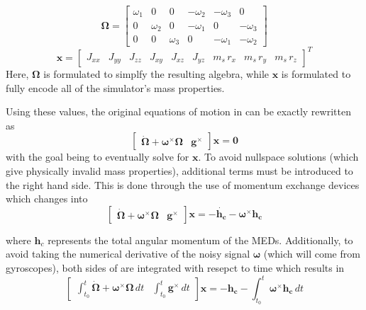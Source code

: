 \begin{equation}
    \bm{\Omega} =
        \begin{bmatrix}
            \omega_1 & 0 & 0 & -\omega_2 & -\omega_3 & 0 \\
            0 & \omega_2 & 0 & -\omega_1 & 0 & -\omega_3 \\
            0 & 0 & \omega_3 & 0 & -\omega_1 & -\omega_2
        \end{bmatrix}
\end{equation}
\begin{equation}
    \bm{x} = \begin{bmatrix}
        J_{xx} & J_{yy} & J_{zz} & J_{xy} & J_{xz} & J_{yz} & m_s\,r_x & m_s\,r_y & m_s\,r_z
    \end{bmatrix}^T
\end{equation}
Here, $\bm{\Omega}$ is formulated to simplfy the resulting algebra, while $\bm{x}$ is formulated to fully encode all of the simulator's mass properties.

Using these values, the original equations of motion in  can be exactly rewritten as 
\begin{equation}\label{equation:no_MEDs}
    \begin{bmatrix}
        \dot{\bm{\Omega}}+\bm{\omega}^{\times}\bm{\Omega} & \bm{g}^{\times}
    \end{bmatrix}\bm{x}
    =\bm{0}
\end{equation}
with the goal being to eventually solve for $\bm{x}$. To avoid nullspace solutions (which give physically invalid mass properties), additional terms must be introduced to the right hand side. This is done through the use of momentum exchange devices which changes  into 
\begin{equation}\label{equation:with_MEDs}
    \begin{bmatrix}
    \dot{\bm{\Omega}}+\bm{\omega}^{\times}\bm{\Omega} & \bm{g}^{\times}
    \end{bmatrix}\bm{x}
    =-\dot{\bm{h_c}} - \bm{\omega}^{\times}\bm{h_c}
\end{equation}

where $\bm{h}_c$ represents the total angular momentum of the MEDs. Additionally, to avoid taking the numerical derivative of the noisy signal $\bm{\omega}$ (which will come from gyroscopes), both sides of  are integrated with resepct to time which results in 
\begin{equation}\label{equation:LSM_no_k}
    \begin{bmatrix}
    \int_{t_0}^{t}\dot{\bm{\Omega}}+\bm{\omega}^{\times}\bm{\Omega}\,dt & \int_{t_0}^{t}\bm{g}^{\times}\,dt
    \end{bmatrix}\bm{x}
    =-{\bm{h_c}} - \int_{t_0}^{t}\bm{\omega}^{\times}\bm{h_c}\,dt
\end{equation}

